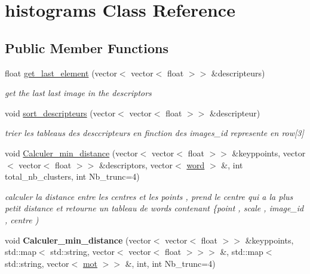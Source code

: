 \hypertarget{classhistograms}{
\section{histograms Class Reference}
\label{classhistograms}
}
\subsection*{Public Member Functions}
\begin{DoxyCompactItemize}
\item 
\hypertarget{classhistograms_a9a5207bc961be545832cc8287446afce}{
float \hyperlink{classhistograms_a9a5207bc961be545832cc8287446afce}{get\_\-last\_\-element} (vector$<$ vector$<$ float $>$$>$ \&descripteurs)}
\label{classhistograms_a9a5207bc961be545832cc8287446afce}

\begin{DoxyCompactList}\small\item\em get the last last image in the descriptors \end{DoxyCompactList}\item 
\hypertarget{classhistograms_ac0ab4640283cc80f15b59a5269a0fcfa}{
void \hyperlink{classhistograms_ac0ab4640283cc80f15b59a5269a0fcfa}{sort\_\-descripteurs} (vector$<$ vector$<$ float $>$$>$ \&descripteur)}
\label{classhistograms_ac0ab4640283cc80f15b59a5269a0fcfa}

\begin{DoxyCompactList}\small\item\em trier les tableaus des desccripteurs en finction des images\_\-id represente en row\mbox{[}3\mbox{]} \end{DoxyCompactList}\item 
\hypertarget{classhistograms_abe7424c07446de02e494914eb04f8ff4}{
void \hyperlink{classhistograms_abe7424c07446de02e494914eb04f8ff4}{Calculer\_\-min\_\-distance} (vector$<$ vector$<$ float $>$$>$ \&keyppoints, vector$<$ vector$<$ float $>$$>$ \&descriptors, vector$<$ \hyperlink{classword}{word} $>$ \&, int total\_\-nb\_\-clusters, int Nb\_\-trunc=4)}
\label{classhistograms_abe7424c07446de02e494914eb04f8ff4}

\begin{DoxyCompactList}\small\item\em calculer la distance entre les centres et les points , prend le centre qui a la plus petit distance et retourne un tableau de words contenant \{point , scale , image\_\-id , centre ) \end{DoxyCompactList}\item 
\hypertarget{classhistograms_a827aa329900a8b7833e368103a3b3a3a}{
void {\bfseries Calculer\_\-min\_\-distance} (vector$<$ vector$<$ float $>$$>$ \&keyppoints, std::map$<$ std::string, vector$<$ vector$<$ float $>$$>$$>$ \&, std::map$<$ std::string, vector$<$ \hyperlink{classmot}{mot} $>$$>$ \&, int, int Nb\_\-trunc=4)}
\label{classhistograms_a827aa329900a8b7833e368103a3b3a3a}


\end{DoxyCompactItemize}
